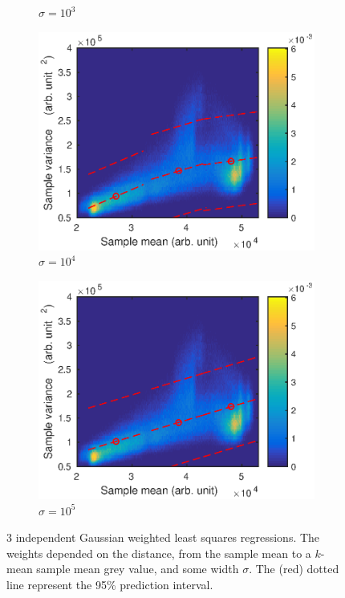 \documentclass[12pt]{report}
\begin{document}
\begin{figure}
\begin{subfigure}{0.45\textwidth}
		\caption{$\sigma=10^3$}
	\end{subfigure}
	\begin{subfigure}{0.45\textwidth}
		\includegraphics[width=\textwidth]{figures/meanVar/gaussian_3.eps}
		\caption{$\sigma=10^4$}
	\end{subfigure}
	\begin{subfigure}{0.45\textwidth}
		\includegraphics[width=\textwidth]{figures/meanVar/gaussian_4.eps}
		\caption{$\sigma=10^5$}
	\end{subfigure}
	\caption{3 independent Gaussian weighted least squares regressions. The weights depended on the distance, from the sample mean to a $k$-mean sample mean grey value, and some width $\sigma$. The (red) dotted line represent the 95\% prediction interval.}
	\label{fig:meanVar_distanceWeighted}
\end{figure}
\end{document}
